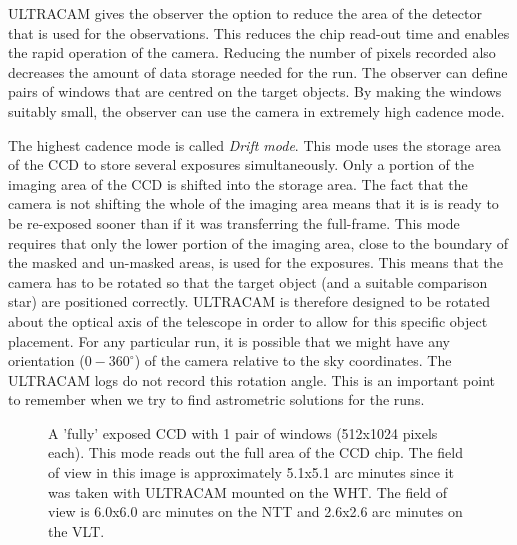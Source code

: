 ULTRACAM gives the observer the option to reduce the area of the detector that is used for the observations. This reduces the chip read-out time and enables the rapid operation of the camera. Reducing the number of pixels recorded also decreases the amount of data storage needed for the run. The observer can define pairs of windows that are centred on the target objects. By making the windows suitably small, the observer can use the camera in extremely high cadence mode. 

The highest cadence mode is called \emph{Drift mode}. This mode uses the storage area of the CCD to store several exposures simultaneously. Only a portion of the imaging area of the CCD is shifted into the storage area. The fact that the camera is not shifting the whole of the imaging area means that it is is ready to be re-exposed sooner than if it was transferring the full-frame. This mode requires that only the lower portion of the imaging area, close to the boundary of the masked and un-masked areas, is used for the exposures. This means that the camera has to be rotated so that the target object (and a suitable comparison star) are positioned correctly. ULTRACAM is therefore designed to be rotated about the optical axis of the telescope in order to allow for this specific object placement. For any particular run, it is possible that we might have any orientation ($0-360^{\circ}$) of the camera relative to the sky coordinates. The ULTRACAM logs do not record this rotation angle. This is an important point to remember when we try to find astrometric solutions for the runs.    

\begin{figure}
  \centering
  \setlength{\fboxsep}{0pt}
  \setlength{\fboxrule}{1pt}
  \caption{A 'fully' exposed CCD with 1 pair of windows (512x1024 pixels each).  This mode reads out the full area of the CCD chip. The field of view in this image is approximately 5.1x5.1 arc minutes since it was taken with ULTRACAM mounted on the WHT. The field of view is 6.0x6.0 arc minutes on the NTT and 2.6x2.6 arc minutes on the VLT.}
  \label{fig:KOI-824}
\end{figure}

